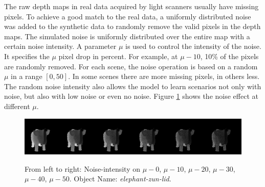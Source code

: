 The raw depth maps in real data acquired by light scanners usually have missing pixels. To achieve a good match to the real data, a uniformly distributed noise was added to the synthetic data to randomly remove the valid pixels in the depth maps.
The simulated noise is uniformly distributed over the entire map with a certain noise intensity. A parameter $ \mu $ is used to control the intensity of the noise. It specifies the $ \mu $ pixel drop in percent. For example, at $ \mu-10 $, 10\% of the pixels are randomly removed. For each scene, the noise operation is based on a random $ \mu $ in a range $ \left[0, 50\right] $. In some scenes there are more missing pixels, in others less. The random noise intensity also allows the model to learn scenarios not only with noise, but also with low noise or even no noise.
Figure \ref{fig:noise-intensity} shows the noise effect at different $ \mu $.



\begin{figure}[!h]
	\centering
	\captionsetup{width=\linewidth}
	{\includegraphics[width=\textwidth]{./Figures/add_noise_depth.png}}
	\decoRule
	\caption{From left to right: Noise-intensity on $ \mu-0$, $\mu-10$, $\mu-20$, $\mu-30$, $\mu-40$, $\mu-50$. Object Name: \textit{elephant-zun-lid}.}
	\label{fig:noise-intensity}
\end{figure}


